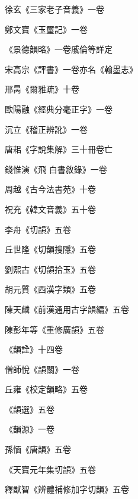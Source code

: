\begin{pinyinscope}
 徐玄《三家老子音義》一卷



 鄭文寶《玉璽記》一卷



 《景德韻略》一卷戚倫等詳定



 宋高宗《評書》一卷亦名《翰墨志》



 邢昺《爾雅疏》十卷



 歐陽融《經典分毫正字》一卷



 沉立《稽正辨訛》一卷



 唐耜《字說集解》三十冊卷亡



 錢惟演《飛
 白書敘錄》一卷



 周越《古今法書苑》十卷



 祝充《韓文音義》五十卷



 李舟《切韻》五卷



 丘世隆《切韻搜隱》五卷



 劉熙古《切韻拾玉》五卷



 胡元質《西漢字類》五卷



 陳天麟《前漢通用古字韻編》五卷



 陳彭年等《重修廣韻》五卷



 《韻詮》十四卷



 僧師悅《韻關》一卷



 丘雍《校定韻略》五卷



 《韻選》五卷



 《韻源》一卷



 孫愐《唐韻》五卷



 《天寶元年集切韻》五卷



 釋猷智《辨體補修加字切韻》五卷




\end{pinyinscope}
